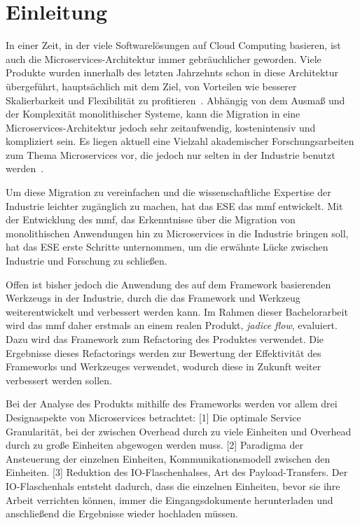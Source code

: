 \chapter{Einleitung}
\label{chap:einleitung}

In einer Zeit, in der viele Softwarelösungen auf Cloud Computing basieren, ist auch die Microservices-Architektur immer gebräuchlicher geworden.
Viele Produkte wurden innerhalb des letzten Jahrzehnts schon in diese Architektur übergeführt, hauptsächlich mit dem Ziel, von Vorteilen wie besserer Skalierbarkeit und Flexibilität zu profitieren~\cite{Fritzsch_2019}.
Abhängig von dem Ausmaß und der Komplexität monolithischer Systeme, kann die Migration in eine Microservices-Architektur jedoch sehr zeitaufwendig, kostenintensiv und kompliziert sein.
Es liegen aktuell eine Vielzahl akademischer Forschungsarbeiten zum Thema Microservices vor, die jedoch nur selten in der Industrie benutzt werden~\cite{fritzsch2022architecturecentric}.

Um diese Migration zu vereinfachen und die wissenschaftliche Expertise der Industrie leichter zugänglich zu machen, hat das ESE das \gls{mmf} entwickelt.
Mit der Entwicklung des \gls{mmf}, das Erkenntnisse über die Migration von monolithischen Anwendungen hin zu Microservices in die Industrie bringen soll, hat das ESE erste Schritte unternommen, um die erwähnte Lücke zwischen Industrie und Forschung zu schließen.

Offen ist bisher jedoch die Anwendung des auf dem Framework basierenden Werkzeugs in der Industrie, durch die das Framework und Werkzeug weiterentwickelt und verbessert werden kann.
Im Rahmen dieser Bachelorarbeit wird das \acrshort{mmf} daher erstmals an einem realen Produkt, \emph{jadice flow}, evaluiert.
Dazu wird das Framework zum Refactoring des Produktes verwendet.
Die Ergebnisse dieses Refactorings werden zur Bewertung der Effektivität des Frameworks und Werkzeuges verwendet, wodurch diese in Zukunft weiter verbessert werden sollen.

Bei der Analyse des Produkts mithilfe des Frameworks werden vor allem drei Designaspekte von Microservices betrachtet:
[1] Die optimale Service Granularität, bei der zwischen Overhead durch zu viele Einheiten und Overhead durch zu große Einheiten abgewogen werden muss.
[2] Paradigma der Ansteuerung der einzelnen Einheiten, Kommunikationsmodell zwischen den Einheiten.
[3] Reduktion des IO-Flaschenhalses, Art des Payload-Transfers.
Der IO-Flaschenhals entsteht dadurch, dass die einzelnen Einheiten, bevor sie ihre Arbeit verrichten können, immer die Eingangsdokumente herunterladen und anschließend die Ergebnisse wieder hochladen müssen.

